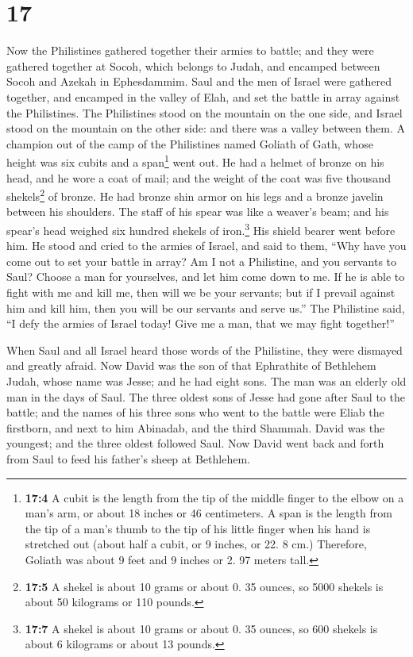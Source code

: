 \hypertarget{section-16}{%
\section{17}\label{section-16}}

 Now the Philistines gathered together their armies to
battle; and they were gathered together at Socoh, which belongs to
Judah, and encamped between Socoh and Azekah in Ephesdammim.
 Saul and the men of Israel were gathered together, and
encamped in the valley of Elah, and set the battle in array against the
Philistines.  The Philistines stood on the mountain on the
one side, and Israel stood on the mountain on the other side: and there
was a valley between them.  A champion out of the camp of
the Philistines named Goliath of Gath, whose height was six cubits and a
span\footnote{\textbf{17:4} A cubit is the length from the tip of the
  middle finger to the elbow on a man's arm, or about 18 inches or 46
  centimeters. A span is the length from the tip of a man's thumb to the
  tip of his little finger when his hand is stretched out (about half a
  cubit, or 9 inches, or 22. 8 cm.) Therefore, Goliath was about 9 feet
  and 9 inches or 2. 97 meters tall.} went out.  He had a
helmet of bronze on his head, and he wore a coat of mail; and the weight
of the coat was five thousand shekels\footnote{\textbf{17:5} A shekel is
  about 10 grams or about 0. 35 ounces, so 5000 shekels is about 50
  kilograms or 110 pounds.} of bronze.  He had bronze shin
armor on his legs and a bronze javelin between his shoulders.
 The staff of his spear was like a weaver's beam; and his
spear's head weighed six hundred shekels of iron.\footnote{\textbf{17:7}
  A shekel is about 10 grams or about 0. 35 ounces, so 600 shekels is
  about 6 kilograms or about 13 pounds.} His shield bearer went before
him.  He stood and cried to the armies of Israel, and said
to them, ``Why have you come out to set your battle in array? Am I not a
Philistine, and you servants to Saul? Choose a man for yourselves, and
let him come down to me.  If he is able to fight with me
and kill me, then will we be your servants; but if I prevail against him
and kill him, then you will be our servants and serve us.''
 The Philistine said, ``I defy the armies of Israel
today! Give me a man, that we may fight together!''

 When Saul and all Israel heard those words of the
Philistine, they were dismayed and greatly afraid.  Now
David was the son of that Ephrathite of Bethlehem Judah, whose name was
Jesse; and he had eight sons. The man was an elderly old man in the days
of Saul.  The three oldest sons of Jesse had gone after
Saul to the battle; and the names of his three sons who went to the
battle were Eliab the firstborn, and next to him Abinadab, and the third
Shammah.  David was the youngest; and the three oldest
followed Saul.  Now David went back and forth from Saul
to feed his father's sheep at Bethlehem.

